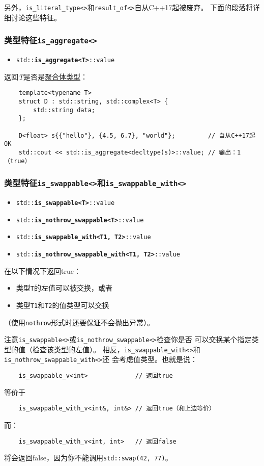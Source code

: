 另外，\texttt{is\_literal\_type<>}和\texttt{result\_of<>}自从C++17起被废弃。
下面的段落将详细讨论这些特征。

\subsubsection{类型特征\texttt{is\_aggregate<>}}\label{ch21.2.0.1}
\begin{itemize}
    \item[] \texttt{std::\textbf{is\_aggregate<T>}::value}
\end{itemize}
返回\emph{T}是否是\hyperref[ch4.3]{聚合体类型}：
\begin{lstlisting}
    template<typename T>
    struct D : std::string, std::complex<T> {
        std::string data;
    };

    D<float> s{{"hello"}, {4.5, 6.7}, "world"};         // 自从C++17起OK
    std::cout << std::is_aggregate<decltype(s)>::value; // 输出：1（true）
\end{lstlisting}

\subsubsection{类型特征\texttt{is\_swappable<>}和\texttt{is\_swappable\_with<>}}
\begin{itemize}
    \item[] \texttt{std::\textbf{is\_swappable<T>}::value}
    \item[] \texttt{std::\textbf{is\_nothrow\_swappable<T>}::value}
    \item[] \texttt{std::\textbf{is\_swappable\_with<T1, T2>}::value}
    \item[] \texttt{std::\textbf{is\_nothrow\_swappable\_with<T1, T2>}::value}
\end{itemize}
在以下情况下返回true：
\begin{itemize}
    \item 类型\texttt{T}的左值可以被交换，或者
    \item 类型\texttt{T1}和\texttt{T2}的值类型可以交换
\end{itemize}
（使用\texttt{nothrow}形式时还要保证不会抛出异常）。

注意\texttt{is\_swappable<>}或\texttt{is\_nothrow\_swappable<>}检查你是否
可以交换某个指定类型的值（检查该类型的左值）。
相反，\texttt{is\_swappable\_with<>}和\texttt{is\_nothrow\_swappable\_with<>}还
会考虑值类型。也就是说：
\begin{lstlisting}
    is_swappable_v<int>             // 返回true
\end{lstlisting}
等价于
\begin{lstlisting}
    is_swappable_with_v<int&, int&> // 返回true（和上边等价）
\end{lstlisting}
而：
\begin{lstlisting}
    is_swappable_with_v<int, int>   // 返回false
\end{lstlisting}
将会返回false，因为你不能调用\texttt{std::swap(42, 77)}。

